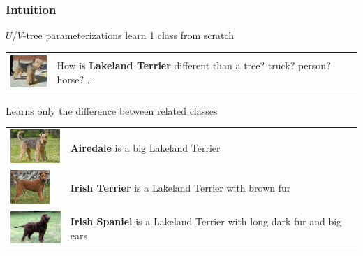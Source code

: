 \begin{frame}
\frametitle{Intuition}

$U$/$V$-tree parameterizations learn 1 class from scratch

\vspace{0.1in}
    \begin{tabular}{m{0.7in}m{3.8in}}
        \includegraphics[height=0.5in]{img/Lakeland_Terrier} & How is \textbf{Lakeland Terrier} different than a tree? truck? person? horse? ... \\
\end{tabular}

\vspace{0.2in}
Learns only the difference between related classes

    \vspace{0.1in}
\begin{tabular}{m{0.7in}m{3.8in}}
    \includegraphics[height=0.5in]{img/Airedale} & \textbf{Airedale} is a big Lakeland Terrier \\
    \includegraphics[height=0.5in]{img/Irish-Terrier} & \textbf{Irish Terrier} is a Lakeland Terrier with brown fur \\
    \includegraphics[height=0.5in]{img/water_spaniel} & \textbf{Irish Spaniel} is a Lakeland Terrier with long dark fur and big ears\\
\end{tabular}
\end{frame}
